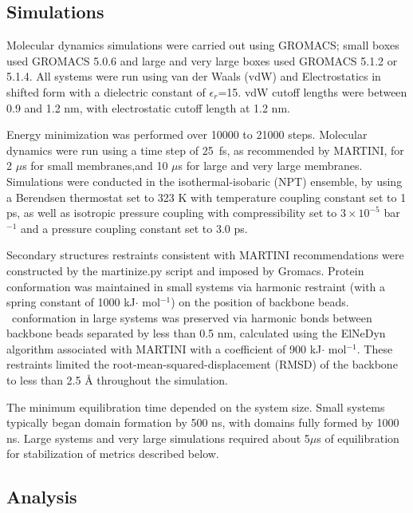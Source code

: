 \subsection{Simulations}


Molecular dynamics simulations were carried out using GROMACS\citep{Berendsen1995}; small boxes used GROMACS 5.0.6 and large {and very large} boxes used  GROMACS 5.1.2 or 5.1.4. All systems were run using van der Waals (vdW) and Electrostatics in shifted form with a dielectric constant of $\epsilon_r$=15. vdW cutoff lengths were between 0.9 and 1.2 nm, with electrostatic cutoff length at 1.2 nm.

Energy minimization was performed over 10000 to 21000 steps.  Molecular dynamics were run using a time step of 25~fs, as recommended by MARTINI, for 2 $\mu$s for {small membranes,and 10 $\mu$s for large and very large membranes}. Simulations were conducted in the isothermal-isobaric (NPT) ensemble, by using a Berendsen thermostat set to 323 K with temperature coupling constant set to  1 ps, as well as isotropic pressure coupling with compressibility set to $3\times 10^{-5}$ bar$^{-1}$ and a pressure coupling constant set to 3.0 ps. 


Secondary structures restraints consistent with MARTINI recommendations were constructed by the martinize.py \citep{martini} script {and} imposed by Gromacs\citep{Berendsen1995}. Protein conformation was maintained in small systems via harmonic restraint (with a spring constant of 1000 kJ$\cdot$ mol$^{-1}$) on the position of backbone beads. \nachr~conformation in large systems was preserved via harmonic bonds between backbone beads separated by less than 0.5 nm, calculated using the ElNeDyn algorithm \citep{Periole_Combining_2009} associated with MARTINI\citep{martini}  with a coefficient of 900 kJ$\cdot$ mol$^{-1}$.  These restraints limited the root-mean-squared-displacement (RMSD) of the backbone to less than 2.5 \r{A} throughout the simulation.  

The minimum equilibration time depended on the system size. Small systems typically began domain formation by 500 ns, with domains fully formed by 1000 ns. Large systems and very large simulations required about 5$\mu$s of equilibration for stabilization of metrics described below.

\subsection{Analysis}

